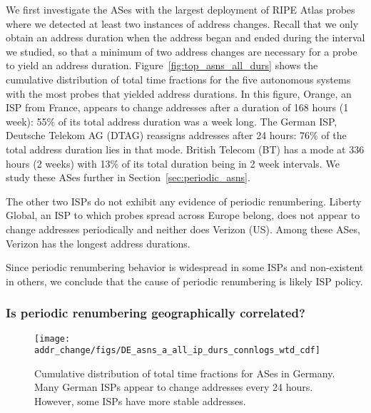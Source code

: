 We first investigate the ASes with the largest deployment of RIPE
Atlas probes where we detected at least two instances of address
changes. Recall that we only obtain an address duration when the
address began and ended during the interval we studied, so that a
minimum of two address changes are necessary for a probe to yield an
address duration.  Figure~\ref{fig:top_asns_all_durs} shows the
cumulative distribution of total time fractions
for the five autonomous systems
with the most probes that yielded address durations. In this figure, Orange, an ISP from France, appears to change addresses
after a duration of 168 hours (1 week): 55\% of its total
address duration was a week long. The German ISP, Deutsche Telekom AG (DTAG)
reassigns addresses after 24 hours: 76\% of the total address duration
lies in that mode. British
Telecom (BT) has a mode at 336 hours (2 weeks) with 13\% of its
total duration being in 2 week intervals. We study these ASes further
in Section~\ref{sec:periodic_asns}.

The other two ISPs do not exhibit any evidence of periodic
renumbering. Liberty Global, an ISP to which probes spread
across Europe belong, does not appear to change addresses periodically
and neither does Verizon (US). Among these ASes, Verizon
has the longest address durations.

Since periodic renumbering behavior is widespread in some ISPs and
non-existent in others, we conclude that the cause of periodic renumbering is likely ISP
policy. 

\subsubsection{Is periodic renumbering geographically correlated?}
\label{sec:germany}

\begin{figure}[tb]
  \begin{center}
    \texttt{[image: addr\_change/figs/DE\_asns\_a\_all\_ip\_durs\_connlogs\_wtd\_cdf]}
  \end{center}
  \caption[Cumulative distribution of total time fraction for German ASes]{\label{fig:DE_asns_all_durs}
    Cumulative distribution of total time fractions for ASes in Germany.
        Many
      German ISPs appear to change addresses every 24 hours. However,
      some ISPs have more stable addresses.
  }
\end{figure}


